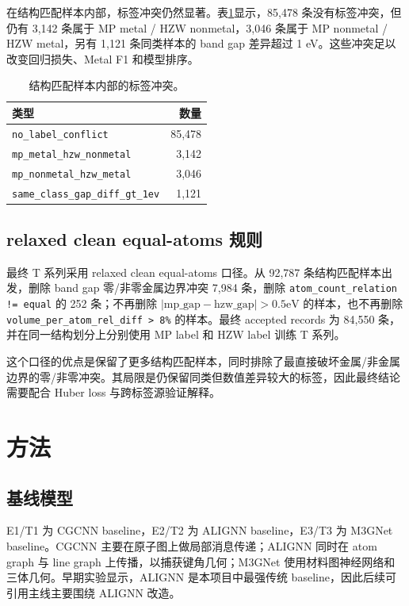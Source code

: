 \documentclass[UTF8,a4paper,11pt]{ctexart}
\newcommand{\ev}{\mathrm{eV}}
\begin{document}
在结构匹配样本内部，标签冲突仍然显著。表\ref{tab:label-conflict}显示，85,478 条没有标签冲突，但仍有 3,142 条属于 MP metal / HZW nonmetal，3,046 条属于 MP nonmetal / HZW metal，另有 1,121 条同类样本的 band gap 差异超过 1 eV。这些冲突足以改变回归损失、Metal F1 和模型排序。

\begin{table}[htbp]
\centering
\caption{结构匹配样本内部的标签冲突。}
\label{tab:label-conflict}
\small
\begin{tabular}{l r}
\toprule
类型 & 数量 \\
\midrule
\texttt{no\_label\_conflict} & 85,478 \\
\texttt{mp\_metal\_hzw\_nonmetal} & 3,142 \\
\texttt{mp\_nonmetal\_hzw\_metal} & 3,046 \\
\texttt{same\_class\_gap\_diff\_gt\_1ev} & 1,121 \\
\bottomrule
\end{tabular}
\end{table}

\subsection{relaxed clean equal-atoms 规则}

最终 T 系列采用 relaxed clean equal-atoms 口径。从 92,787 条结构匹配样本出发，删除 band gap 零/非零金属边界冲突 7,984 条，删除 \texttt{atom\_count\_relation != equal} 的 252 条；不再删除 $\lvert \mathrm{mp\_gap}-\mathrm{hzw\_gap}\rvert > 0.5\ev$ 的样本，也不再删除 \texttt{volume\_per\_atom\_rel\_diff > 8\%} 的样本。最终 accepted records 为 84,550 条，并在同一结构划分上分别使用 MP label 和 HZW label 训练 T 系列。

这个口径的优点是保留了更多结构匹配样本，同时排除了最直接破坏金属/非金属边界的零/非零冲突。其局限是仍保留同类但数值差异较大的标签，因此最终结论需要配合 Huber loss 与跨标签源验证解释。

\section{方法}

\subsection{基线模型}

E1/T1 为 CGCNN baseline，E2/T2 为 ALIGNN baseline，E3/T3 为 M3GNet baseline。CGCNN 主要在原子图上做局部消息传递；ALIGNN 同时在 atom graph 与 line graph 上传播，以捕获键角几何；M3GNet 使用材料图神经网络和三体几何。早期实验显示，ALIGNN 是本项目中最强传统 baseline，因此后续可引用主线主要围绕 ALIGNN 改造。
\end{document}
